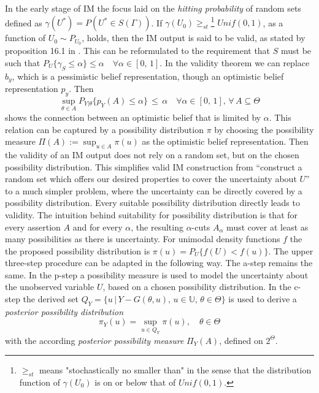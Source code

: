 \documentclass[
]{report}
\theoremstyle{definition}
\theoremstyle{definition}
\begin{document}
In the early stage of IM the focus laid on the
\textit{hitting probability} of random sets defined as
\(\gamma(U^*) = P(U^* \in S(\Gamma))\). If
\(\gamma(U_0) \geq_{st}\)\footnote{$\geq_{st}$ means "stochastically no smaller than" in the sense that the distribution function of $\gamma (U_0)$ is on or below that of $Unif(0,1)$.}
\(Unif(0,1)\), as a function of \(U_0 \sim P_{U_0}\), holds, then the IM
output is said to be valid, as stated by proposition 16.1 in
\cite{berger_handbook_2024}. This can be reformulated to the requirement
that \(S\) must be such that
\(P_U \{\gamma_S \leq \alpha \} \leq \alpha \quad \forall \alpha \in [0, \, 1]\).
In the validity theorem we can replace \(b_y\), which is a pessimistic
belief representation, though an optimistic belief representation
\(p_y\). Then
\[\sup_{\theta \in A} P_{Y | \theta} \{p_Y (A) \leq \alpha \} \, \leq \, \alpha \quad \forall \alpha \in [0, \, 1], \, \forall \, A \subseteq \Theta\]
shows the connection between an optimistic belief that is limited by
\(\alpha\). This relation can be captured by a possibility distribution
\(\pi\) by choosing the possibility measure
\(\Pi(A) := \sup_{u \in A} \pi (u)\) as the optimistic belief
representation. Then the validity of an IM output does not rely on a
random set, but on the chosen possibility distribution. This simplifies
valid IM construction from ``construct a random set which offers our
desired properties to cover the uncertainty about \(U\)'' to a much
simpler problem, where the uncertainty can be directly covered by a
possibility distribution. Every suitable possibility distribution
directly leads to validity. The intuition behind suitability for
possibility distribution is that for every assertion \(A\) and for every
\(\alpha\), the resulting \(\alpha\)-cuts \(A_\alpha\) must cover at
least as many possibilities as there is uncertainty. For unimodal
density functions \(f\) the the proposed possibility distribution is
\(\pi (u) = P_U \{ f(U) < f(u) \}\). The upper three-step procedure can
be adapted in the following way. The a-step remains the same. In the
p-step a possibility measure is used to model the uncertainty about the
unobserved variable \(U\), based on a chosen possibility distribution.
In the c-step the derived set
\(Q_Y = \{ u \, | \, Y - G(\theta, u), \, u \in \mathbb{U}, \, \theta \in \Theta \}\)
is used to derive a \textit{posterior possibility distribution}
\[\pi_Y (u) = \sup_{u \in Q_Y} \pi (u), \quad \theta \in \Theta\] with
the according \textit{posterior possibility measure} \(\Pi_Y(A)\),
defined on \(2^{\Theta}\).


\printbibliography
\end{document}
